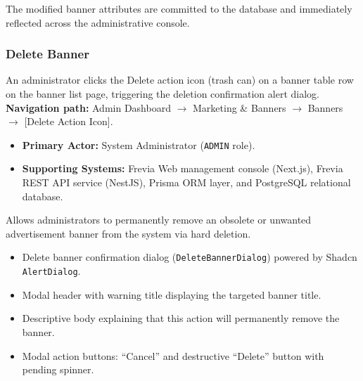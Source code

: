 \noindent The modified banner attributes are committed to the database and immediately reflected across the administrative console.

\subsubsection{ Delete Banner}

An administrator clicks the Delete action icon (trash can) on a banner table row on the banner list page, triggering the deletion confirmation alert dialog.\newline
\textbf{Navigation path:} Admin Dashboard $\rightarrow$ Marketing \& Banners $\rightarrow$ Banners $\rightarrow$ [Delete Action Icon].


\begin{itemize}[leftmargin=1.6em,topsep=3pt,itemsep=2pt,parsep=0pt,label=$\bullet$]
    \item \textbf{Primary Actor:} System Administrator (\texttt{ADMIN} role).
    \item \textbf{Supporting Systems:} Frevia Web management console (Next.js), Frevia REST API service (NestJS), Prisma ORM layer, and PostgreSQL relational database.
\end{itemize}

\noindent Allows administrators to permanently remove an obsolete or unwanted advertisement banner from the system via hard deletion.

\begin{itemize}[leftmargin=1.6em,topsep=3pt,itemsep=2pt,parsep=0pt,label=$\bullet$]
    \item Delete banner confirmation dialog (\texttt{DeleteBannerDialog}) powered by Shadcn \texttt{AlertDialog}.
    \item Modal header with warning title displaying the targeted banner title.
    \item Descriptive body explaining that this action will permanently remove the banner.
    \item Modal action buttons: ``Cancel'' and destructive ``Delete'' button with pending spinner.
\end{itemize}


